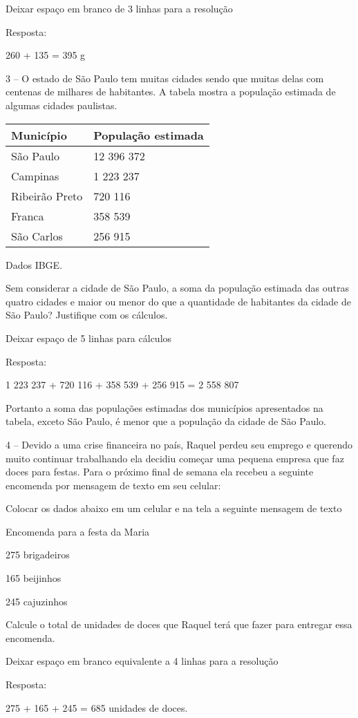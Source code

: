 Deixar espaço em branco de 3 linhas para a resolução

Resposta:

260 + 135 = 395 g

3 -- O estado de São Paulo tem muitas cidades sendo que muitas delas com
centenas de milhares de habitantes. A tabela mostra a população estimada
de algumas cidades paulistas.

\begin{longtable}[]{@{}ll@{}}
\toprule
Município & População estimada\tabularnewline
\midrule
\endhead
São Paulo & 12 396 372\tabularnewline
Campinas & 1 223 237\tabularnewline
Ribeirão Preto & 720 116\tabularnewline
Franca & 358 539\tabularnewline
São Carlos & 256 915\tabularnewline
\bottomrule
\end{longtable}

Dados IBGE.

Sem considerar a cidade de São Paulo, a soma da população estimada das
outras quatro cidades e maior ou menor do que a quantidade de habitantes
da cidade de São Paulo? Justifique com os cálculos.

Deixar espaço de 5 linhas para cálculos

Resposta:

1 223 237 + 720 116 + 358 539 + 256 915 = 2 558 807

Portanto a soma das populações estimadas dos municípios apresentados na
tabela, exceto São Paulo, é menor que a população da cidade de São
Paulo.

4 -- Devido a uma crise financeira no país, Raquel perdeu seu emprego e
querendo muito continuar trabalhando ela decidiu começar uma pequena
empresa que faz doces para festas. Para o próximo final de semana ela
recebeu a seguinte encomenda por mensagem de texto em seu celular:

Colocar os dados abaixo em um celular e na tela a seguinte mensagem de
texto

Encomenda para a festa da Maria

275 brigadeiros

165 beijinhos

245 cajuzinhos

Calcule o total de unidades de doces que Raquel terá que fazer para
entregar essa encomenda.

Deixar espaço em branco equivalente a 4 linhas para a resolução

Resposta:

275 + 165 + 245 = 685 unidades de doces.

